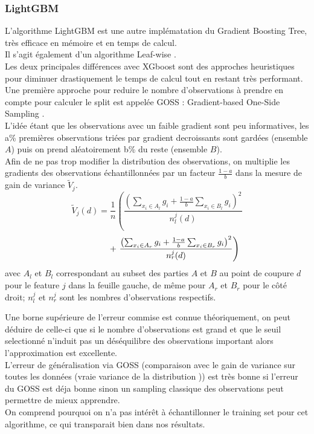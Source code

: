 \documentclass[french]{article}
\begin{document}
\begin{multicols}{2}
\subsubsection{LightGBM}
L'algorithme LightGBM est une autre implématation du Gradient Boosting Tree, très efficace en mémoire et en temps de calcul.\\
Il s'agit également d'un algorithme \og Leaf-wise \fg{}.\\
Les deux principales différences avec XGboost sont des approches heuristiques pour diminuer drastiquement le temps de calcul tout en restant très performant.\\
Une première approche pour reduire le nombre d'observations à prendre en compte pour calculer le split est appelée GOSS : \og Gradient-based One-Side Sampling \fg{} \cite{micr}.\\
L'idée étant que les observations avec un faible gradient sont peu informatives, les a\% premières observations triées par gradient decroissants sont gardées (ensemble $A$) puis on prend aléatoirement b\% du reste (ensemble $B$).\\
Afin de ne pas trop modifier la distribution des observations, on multiplie les gradients des observations échantillonnées par un facteur $\frac{1-a}{b}$ dans la mesure de gain de variance $\tilde{V}_{j}$.\\
\[
\tilde{V}_{j}(d)=\frac{1}{n}\left(\frac{\left(\sum_{x_{i} \in A_{l}} g_{i}+\frac{1-a}{b} \sum_{x_{i} \in B_{l}} g_{i}\right)^{2}}{n_{l}^{j}(d)} \right. \]
\[ \null \qquad \qquad + \left. \frac{\left(\sum_{x_{i} \in A_{r}} g_{i}+\frac{1-a}{b} \sum_{x_{i} \in B_{r}} g_{i}\right)^{2}}{n_{r}^{j}(d)}\right)
\]
avec $A_l$ et $B_l$ correspondant au subset des parties $A$ et $B$ au point de coupure $d$ pour le feature $j$ dans la feuille gauche, de même pour $A_r$ et $B_r$ pour le côté droit; $n_l^j$ et $n_r^j$ sont les nombres d'observations respectifs\footnotemark[14].

Une borne supérieure de l'erreur commise est connue théoriquement, on peut déduire de celle-ci que si le nombre d'observations est grand et que le seuil selectionné n'induit pas un déséquilibre des observations important alors l'approximation est excellente.\\
L'erreur de généralisation via GOSS (comparaison avec le gain de variance sur toutes les données (\og vraie variance de la distribution \fg{})) est très bonne si l'erreur du GOSS est déja bonne sinon un sampling classique des observations peut permettre de mieux apprendre.\\
On comprend pourquoi on n'a pas intérêt à échantillonner le training set pour cet algorithme, ce qui transparait bien dans nos résultats.


\end{multicols}
\end{document}

